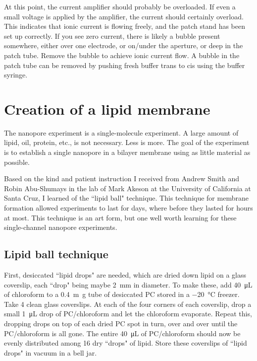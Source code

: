 At this point, the current amplifier should probably be overloaded.  If even a small voltage is applied by the amplifier, the current should certainly overload.  This indicates that ionic current is flowing freely, and the patch stand has been set up correctly.  If you see zero current, there is likely a bubble present somewhere, either over one electrode, or on/under the aperture, or deep in the patch tube.  Remove the bubble to achieve ionic current flow.  A bubble in the patch tube can be removed by pushing fresh buffer trans to cis using the buffer syringe.

\section{Creation of a lipid membrane}

The nanopore experiment is a single-molecule experiment.  A large amount of lipid, oil, protein, etc., is not necessary.  Less is more.  The goal of the experiment is to establish a single nanopore in a bilayer membrane using as little material as possible.

Based on the kind and patient instruction I received from Andrew Smith and Robin Abu-Shumays in the lab of Mark Akeson at the University of California at Santa Cruz, I learned of the ``lipid ball" technique.  This technique for membrane formation allowed experiments to last for days, where before they lasted for hours at most.  This technique is an art form, but one well worth learning for these single-channel nanopore experiments.

\subsection{Lipid ball technique}

First, desiccated ``lipid drops" are needed, which are dried down lipid on a glass coverslip, each ``drop" being maybe \SI{2}{\mm} in diameter.  To make these, add \SI{40}{\micro\L} of chloroform to a \SI{0.4}{\m\g} tube of desiccated PC stored in a \SI{-20}{\celsius} freezer.  Take \num{4} clean glass coverslips.  At each of the four corners of each coverslip, drop a small \SI{1}{\micro\L} drop of PC/chloroform and let the chloroform evaporate.  Repeat this, dropping drops on top of each dried PC spot in turn, over and over until the PC/chloroform is all gone.  The entire \SI{40}{\micro\liter} of PC/chloroform should now be evenly distributed among \num{16} dry ``drops" of lipid.  Store these coverslips of ``lipid drops" in vacuum in a bell jar.


